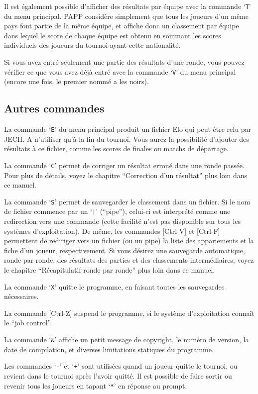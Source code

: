 \documentclass[10pt]{article}
\begin{document}
Il est également possible d'afficher des résultats par équipe 
avec la commande `\verb|T|' du menu principal.  PAPP considère 
simplement que tous les joueurs d'un même pays font partie de la 
même équipe, et affiche donc un classement par équipe dans 
lequel le score de chaque équipe est obtenu en sommant les scores 
individuels des joueurs du tournoi ayant cette nationalité.

	Si vous avez entré seulement une partie des résultats d'une
ronde, vous pouvez vérifier ce que vous avez déjà entré avec la
commande `\verb|V|' du menu principal (encore une fois, le premier nommé
a les noirs).

\subsection{Autres commandes}


La commande `\verb|E|' du menu principal produit un fichier Elo qui 
peut être relu par JECH. A n'utiliser qu'à la fin du tournoi. Vous aurez la possibilité
d'ajouter des résultats à ce fichier, comme les scores de finales ou matchs de départage.

La commande `\verb|C|' permet de corriger un résultat erroné dans 
une ronde passée.  Pour plus de détails, voyez le chapitre 
``Correction d'un résultat'' plus loin dans ce manuel.

La commande `\verb|S|' permet de sauvegarder le classement dans un 
fichier.  Si le nom de fichier commence par un `\verb.|.'  (``pipe''), 
celui-ci est interprété comme une redirection vers une commande 
(cette facilité n'est pas disponible sur tous les systèmes 
d'exploitation).  De même, les commandes [Ctrl-V] et [Ctrl-F] 
permettent de rediriger vers un fichier (ou un pipe) la liste des 
appariements et la fiche d'un joueur, respectivement.  Si vous 
désirez une sauvegarde automatique, ronde par ronde, des résultats 
des parties et des classements intermédiaires, voyez le chapitre 
``Récapitulatif ronde par ronde'' plus loin dans ce manuel.

	La commande `\verb|X|' quitte le programme, en faisant toutes les
sauvegardes nécessaires.

	La commande [Ctrl-Z] suspend le programme, si le système
d'exploitation connaît le ``job control''.

	La commande `\verb|&|' affiche un petit message de copyright, le
numéro de version, la date de compilation, et diverses limitations
statiques du programme.

	Les commandes `\verb|-|' et `\verb|+|' sont utilisées quand un
joueur quitte le tournoi, ou revient dans le tournoi après l'avoir
quitté.  Il est possible de faire sortir ou revenir tous les joueurs
en tapant `\verb|*|' en réponse au prompt.  
\end{document}
